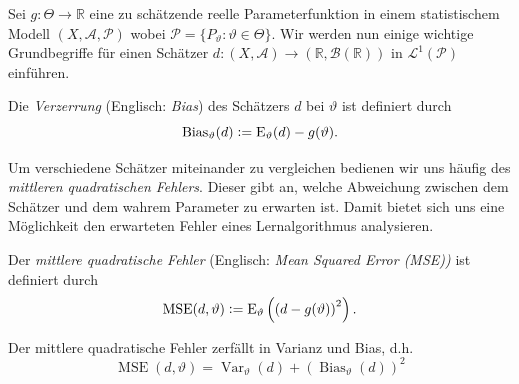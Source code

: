 Sei $g\colon \Theta \to \mathbb {R}$ eine zu schätzende reelle Parameterfunktion in einem statistischem Modell $(X,{\mathcal {A}},\mathcal{P})$ wobei $\mathcal{P} = \{P_{\vartheta } \colon \vartheta \in \Theta \}$. Wir werden nun einige wichtige Grundbegriffe für einen Schätzer $d \colon (X, \mathcal{A}) \rightarrow (\mathbb{R}, \mathcal{B}(\mathbb{R}))$ in $\mathcal{L}^1(\mathcal{P})$ einführen.

\begin{defn}
Die \textit{Verzerrung} (Englisch: \textit{Bias}) des Schätzers $d$ bei $\vartheta$ ist definiert durch
$$\operatorname {Bias} _{\vartheta }(d) \vcentcolon= \operatorname {E} _{\vartheta }(d)-g(\vartheta ).$$
\end{defn}


Um verschiedene Schätzer miteinander zu vergleichen bedienen wir uns häufig des \textit{mittleren quadratischen Fehlers}. Dieser gibt an, welche Abweichung zwischen dem Schätzer und dem wahrem Parameter zu erwarten ist. Damit bietet sich uns eine Möglichkeit den erwarteten Fehler eines Lernalgorithmus analysieren.

\begin{defn}
Der \textit{mittlere quadratische Fehler} (Englisch: \textit{Mean Squared Error (MSE))} ist definiert durch
$$\operatorname {MSE} (d,\vartheta ) \vcentcolon= \operatorname{E} _{\vartheta}\left(\left(d-g(\vartheta )\right)^{2}\right).$$
\end{defn}

\begin{thm}
Der mittlere quadratische Fehler zerfällt in Varianz und Bias, d.h.
$$\operatorname{MSE} (d,\vartheta ) = \operatorname{Var}_{\vartheta }(d)+\left(\operatorname{Bias}_{\vartheta}(d)\right)^{2}$$
\end{thm}

